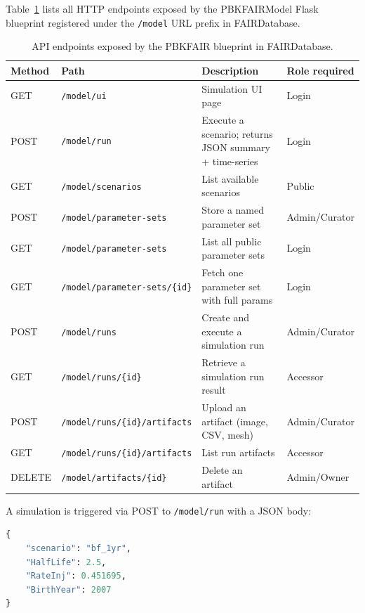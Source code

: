 \documentclass[12pt]{article}
\begin{document}
Table~\ref{tab:api} lists all HTTP endpoints exposed by the
PBKFAIRModel Flask blueprint registered under the \texttt{/model}
URL prefix in FAIRDatabase.

\begin{table}[h]
\centering
\caption{API endpoints exposed by the PBKFAIR blueprint in FAIRDatabase.}
\label{tab:api}
\begin{tabular}{p{1.2cm} p{5.5cm} p{5.5cm} p{2cm}}
\toprule
\textbf{Method} & \textbf{Path} & \textbf{Description} &
\textbf{Role required} \\
\midrule
GET  & \texttt{/model/ui}
     & Simulation UI page
     & Login \\
POST & \texttt{/model/run}
     & Execute a scenario; returns JSON summary + time-series
     & Login \\
GET  & \texttt{/model/scenarios}
     & List available scenarios
     & Public \\
POST & \texttt{/model/parameter-sets}
     & Store a named parameter set
     & Admin/Curator \\
GET  & \texttt{/model/parameter-sets}
     & List all public parameter sets
     & Login \\
GET  & \texttt{/model/parameter-sets/\{id\}}
     & Fetch one parameter set with full params
     & Login \\
POST & \texttt{/model/runs}
     & Create and execute a simulation run
     & Admin/Curator \\
GET  & \texttt{/model/runs/\{id\}}
     & Retrieve a simulation run result
     & Accessor \\
POST & \texttt{/model/runs/\{id\}/artifacts}
     & Upload an artifact (image, CSV, mesh)
     & Admin/Curator \\
GET  & \texttt{/model/runs/\{id\}/artifacts}
     & List run artifacts
     & Accessor \\
DELETE & \texttt{/model/artifacts/\{id\}}
       & Delete an artifact
       & Admin/Owner \\
\bottomrule
\end{tabular}
\end{table}

A simulation is triggered via POST to \texttt{/model/run} with a JSON
body:
\begin{lstlisting}[language=Python, caption={Example POST request body
for /model/run}]
{
    "scenario": "bf_1yr",
    "HalfLife": 2.5,
    "RateInj": 0.451695,
    "BirthYear": 2007
}
\end{lstlisting}
\end{document}
